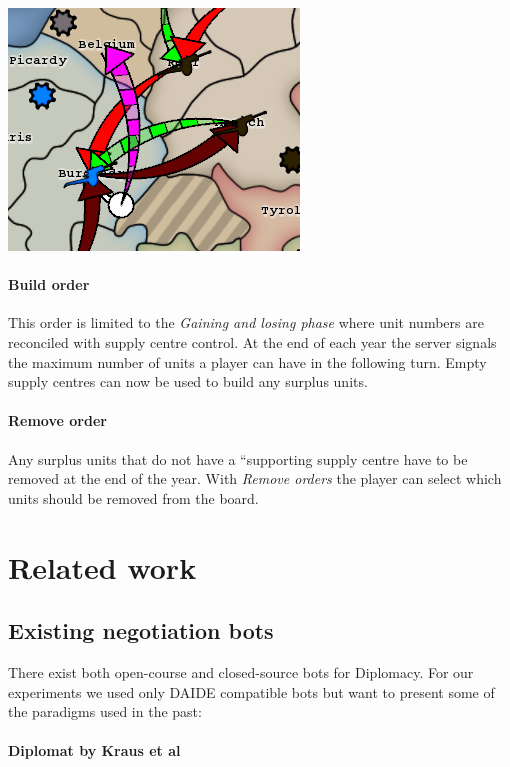 \documentclass[pdftex,11pt,a4paper]{report}
\begin{document}
\includegraphics[scale=0.75]{./screenshots/ImmRetreat0.png} \\[1cm] 

\paragraph{Build order}
This order is limited to the \textit{Gaining and losing phase} where
unit numbers are reconciled with supply centre control. At the end of
each year the server signals the maximum number of units a player can
have in the following turn. Empty supply centres can now be used to
build any surplus units.

\paragraph{Remove order}
Any surplus units that do not have a ``supporting supply centre have
to be removed at the end of the year. With \textit{Remove orders} the
player can select which units should be removed from the board.


\pagebreak

\section{Related work}

\subsection{Existing negotiation bots}

There exist both open-course and closed-source
bots for Diplomacy. For our experiments we used only DAIDE
compatible bots but want to present some of the paradigms
used in the past:

\paragraph{Diplomat by Kraus et al}
\end{document}
